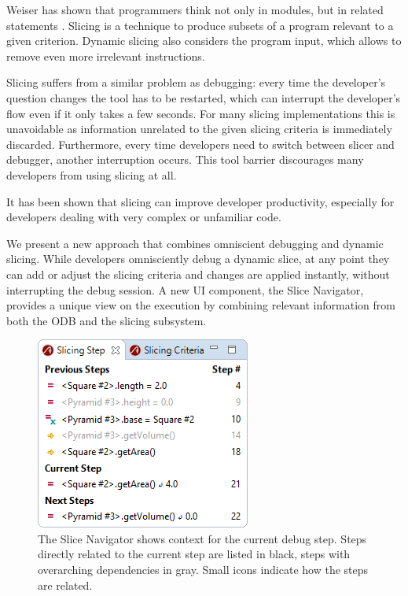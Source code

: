 ﻿\documentclass[
      english,
			conference,
      ]{IEEEtran}
\newcommand{\todo}[2][]{\pdfmargincomment[color=orange,icon=Note,subject={TODO},author={#1}]{#2}}
\begin{document}
Weiser has shown that programmers think not only in modules, but in related statements \cite{weiser_programmers_1982}.
Slicing is a technique to produce subsets of a program relevant to a given criterion.
Dynamic slicing also considers the program input, which allows to remove even more irrelevant instructions\todo{cite}.

Slicing suffers from a similar problem as debugging:
every time the developer's question changes the tool has to be restarted, which can interrupt the developer's flow even if it only takes a few seconds.
For many slicing implementations this is unavoidable as information unrelated to the given slicing criteria is immediately discarded\todo{cite}.
Furthermore, every time developers need to switch between slicer and debugger, another interruption occurs.
This tool barrier discourages many developers from using slicing at all.

It has been shown that slicing can \todo{qualify} improve developer productivity\todo{cite}, especially for developers dealing with very complex or unfamiliar code.

We present a new approach that combines omniscient debugging and dynamic slicing.
While developers omnisciently debug a dynamic slice, at any point they can add or adjust the slicing criteria and changes are applied instantly, without interrupting the debug session.
A new UI component, the Slice Navigator, provides a unique view on the execution by combining relevant information from both the ODB and the slicing subsystem.

\begin{figure}
	\centering
		\includegraphics[width=0.80\linewidth]{slice1.png}
	\caption{The Slice Navigator shows context for the current debug step. Steps directly related to the current step are listed in black, steps with overarching dependencies in gray. Small icons indicate how the steps are related.}
	\label{fig:slice1}
\end{figure}
\end{document}
